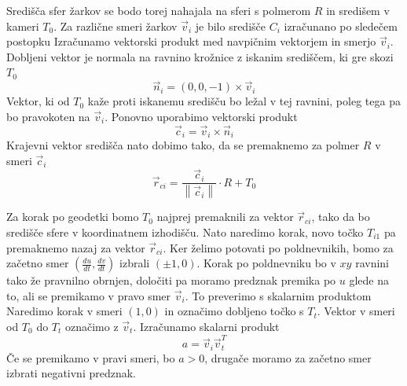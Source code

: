 \documentclass[titlepage]{article}
\begin{document}
Središča sfer žarkov se bodo torej nahajala na sferi s polmerom $R$ in središem v kameri $T_{0}$. Za različne smeri žarkov $\vec{v}_{i}$ je bilo središče $C_{i}$ izračunano po sledečem postopku
\bigskip
\newline
Izračunamo vektorski produkt med navpičnim vektorjem in smerjo $\vec{v}_{i}$. Dobljeni vektor je normala na ravnino krožnice z iskanim središčem, ki gre skozi $T_{0}$
\begin{equation} \label{e:sphC1}
    \vec{n}_{i}=(0, 0, -1) \times \vec{v}_{i}
\end{equation}
Vektor, ki od $T_{0}$ kaže proti iskanemu središču bo ležal v tej ravnini, poleg tega pa bo pravokoten na $\vec{v}_{i}$. Ponovno uporabimo vektorski
produkt
\begin{equation}\label{e:sphC2}
    \vec{c}_{i}= \vec{v}_{i} \times \vec{n}_{i}
\end{equation}
Krajevni vektor središča nato dobimo tako, da se premaknemo za polmer $R$ v smeri $\vec{c}_{i}$
\begin{equation}\label{e:sphC3}
    \vec{r}_{ci}=\frac{\vec{c}_{i}}{\left \| \vec{c}_{i}\right \|} \cdot R + T_{0}
\end{equation}

Za korak po geodetki bomo $T_{0}$ najprej premaknili za vektor $\vec{r}_{ci}$, tako da bo središče sfere v koordinatnem izhodišču. Nato naredimo
korak, novo točko $T_{i1}$ pa premaknemo nazaj za vektor $\vec{r}_{ci}$.
Ker želimo potovati po poldnevnikih, bomo za začetno smer $\left( \frac{du}{dt}, \frac{dv}{dt} \right)$ izbrali $\left( \pm1, 0 \right)$. Korak po poldnevniku bo v $xy$ ravnini tako že pravnilno obrnjen, določiti pa moramo predznak premika po $u$ glede na to, ali se premikamo v pravo smer $\vec{v}_{i}$. To preverimo s skalarnim produktom
\bigskip
\newline
Naredimo korak v smeri $\left( 1, 0 \right)$ in označimo dobljeno točko s $T_{t}$. Vektor v smeri od $T_{0}$ do $T_{t}$ označimo z $\vec{v}_{t}$.
Izračunamo skalarni produkt
\begin{equation} \label{e:dirCorr}
    a= \vec{v}_{i} \vec{v}_{t}^T
\end{equation}
Če se premikamo v pravi smeri, bo $a > 0$, drugače moramo za začetno smer izbrati negativni predznak.
\bigskip
\newline
\end{document}
